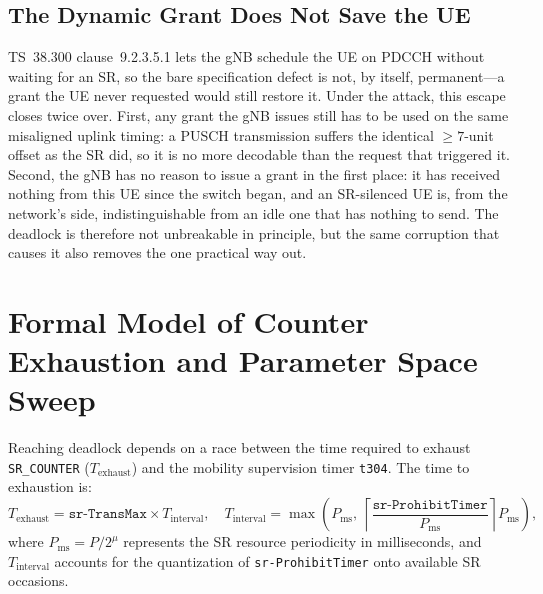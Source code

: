 \subsection{The Dynamic Grant Does Not Save the UE}
\label{sec:m2dyngrant}
TS~38.300 clause~9.2.3.5.1 lets the gNB schedule the UE on PDCCH without waiting for an SR, so the bare
specification defect is not, by itself, permanent---a grant the UE never requested would still restore
it. Under the attack, this escape closes twice over. First, any grant the gNB issues still has to be
used on the same misaligned uplink timing: a PUSCH transmission suffers the identical $\ge 7$-unit
offset as the SR did, so it is no more decodable than the request that triggered it. Second, the gNB
has no reason to issue a grant in the first place: it has received nothing from this UE since the
switch began, and an SR-silenced UE is, from the network's side, indistinguishable from an idle one
that has nothing to send. The deadlock is therefore not unbreakable in principle, but the same
corruption that causes it also removes the one practical way out.

\section{Formal Model of Counter Exhaustion and Parameter Space Sweep}
\label{sec:m2model}

Reaching deadlock depends on a race between the time required to exhaust \texttt{SR\_COUNTER}
($T_{\text{exhaust}}$) and the mobility supervision timer \texttt{t304}. The time to exhaustion is:
\begin{equation}
  T_{\text{exhaust}} = \texttt{sr-TransMax} \times T_{\text{interval}},
  \quad
  T_{\text{interval}} = \max\!\left(P_{\mathrm{ms}},\
    \left\lceil \frac{\texttt{sr-ProhibitTimer}}{P_{\mathrm{ms}}} \right\rceil P_{\mathrm{ms}} \right),
  \label{eq:exhaust}
\end{equation}
where $P_{\mathrm{ms}} = P / 2^{\mu}$ represents the SR resource periodicity in milliseconds, and
$T_{\text{interval}}$ accounts for the quantization of \texttt{sr-ProhibitTimer} onto available SR occasions.

